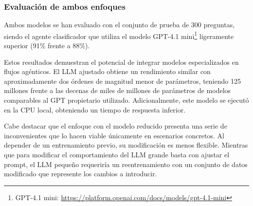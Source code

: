 \subsubsection{Evaluación de ambos enfoques}

Ambos modelos se han evaluado con el conjunto de prueba de 300 preguntas, siendo el agente clasificador que utiliza el modelo GPT-4.1 mini\footnote{GPT-4.1 mini: \url{https://platform.openai.com/docs/models/gpt-4.1-mini}} ligeramente superior (91\% frente a 88\%).

Estos resultados demuestran el potencial de integrar modelos especializados en flujos agénticos. El LLM ajustado obtiene un rendimiento similar con aproximadamente dos órdenes de magnitud menor de parámetros, teniendo 125 millones frente a las decenas de miles de millones de parámetros de modelos comparables al GPT propietario utilizado. Adicionalmente, este modelo se ejecutó en la CPU local, obteniendo un tiempo de respuesta inferior.

Cabe destacar que el enfoque con el modelo reducido presenta una serie de inconvenientes que lo hacen viable únicamente en escenarios concretos. Al depender de un entrenamiento previo, su modificación es menos flexible. Mientras que para modificar el comportamiento del LLM grande basta con ajustar el prompt, el LLM pequeño requeriría un reentrenamiento con un conjunto de datos modificado que represente los cambios a introducir.


